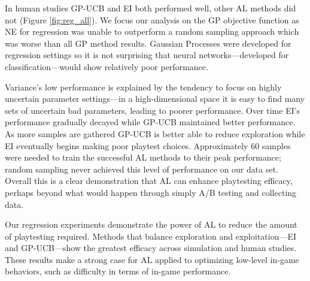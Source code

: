 \documentclass{sig-alternate}
\begin{document}
In human studies GP-UCB and EI both performed well, other AL methods did not (Figure \ref{fig:reg_all}).
We focus our analysis on the GP objective function as NE for regression was unable to outperform a random sampling approach which was worse than all GP method results.
Gaussian Processes were developed for regression settings so it is not surprising that neural networks---developed for classification---would show relatively poor performance.

Variance's low performance is explained by the tendency to focus on highly uncertain parameter settings---in a high-dimensional space it is easy to find many sets of uncertain bad parameters, leading to poorer performance.
Over time EI's performance gradually decayed while GP-UCB maintained better performance.
As more samples are gathered GP-UCB is better able to reduce exploration while EI eventually begins making poor playtest choices.
Approximately 60 samples were needed to train the successful AL methods to their peak performance; random sampling never achieved this level of performance on our data set.
Overall this is a clear demonstration that AL can enhance playtesting efficacy, perhaps beyond what would happen through simply A/B testing and collecting data.

Our regression experiments demonstrate the power of AL to reduce the amount of playtesting required.
Methods that balance exploration and exploitation---EI and GP-UCB---show the greatest efficacy across simulation and human studies.
These results make a strong case for AL applied to optimizing low-level in-game behaviors, such as difficulty in terms of in-game performance.
\end{document}
